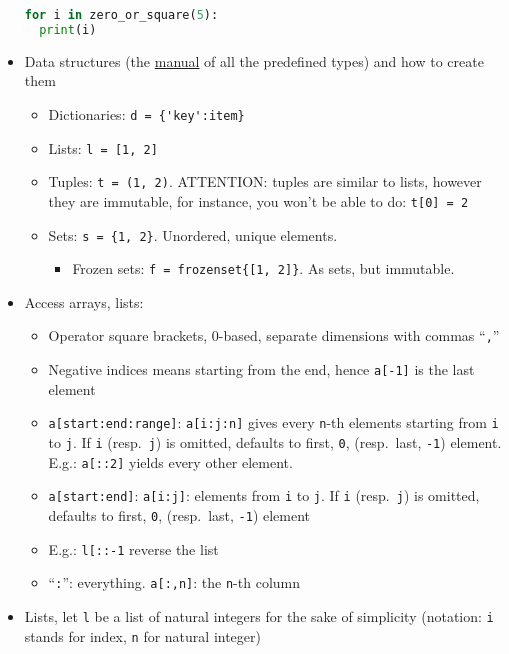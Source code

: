 \documentclass[a4paper,12pt,%
              final%
              ]{article}
\begin{document}
\begin{itemize}
\begin{lstlisting}[language=python]
for i in zero_or_square(5):
  print(i)
\end{lstlisting}
  \item Data structures (the \href{https://docs.python.org/3/library/stdtypes.html}{manual} of all the predefined types) and how to create them
    \begin{itemize}
      \item Dictionaries: \verb|d = {'key':item}|
      \item Lists: \verb|l = [1, 2]|
      \item Tuples: \verb|t = (1, 2)|. ATTENTION: tuples are similar to lists, however they are immutable, for instance, you won't be able to do: \verb|t[0] = 2|
      \item Sets: \verb|s = {1, 2}|. Unordered, unique elements.
        \begin{itemize}
          \item Frozen sets: \verb|f = frozenset{[1, 2]}|. As sets, but immutable.
        \end{itemize}
    \end{itemize}
  \item Access arrays, lists:
    \begin{itemize}
      \item Operator square brackets, 0-based, separate dimensions with commas ``\texttt{,}''
      \item Negative indices means starting from the end, hence \texttt{a[-1]} is the last element
      \item \verb|a[start:end:range]|: \verb|a[i:j:n]| gives every \texttt{n}-th elements starting from \texttt{i} to \texttt{j}. If \texttt{i} (resp.~\texttt{j}) is omitted, defaults to first, \texttt{0}, (resp.~last, \texttt{-1}) element. E.g.: \verb|a[::2]| yields every other element.
      \item \verb|a[start:end]|: \verb|a[i:j]|: elements from \texttt{i} to \texttt{j}. If \texttt{i} (resp.~\texttt{j}) is omitted, defaults to first, \texttt{0}, (resp.~last, \texttt{-1}) element
      \item E.g.: \verb|l[::-1| reverse the list
      \item ``\verb|:|'': everything. \verb|a[:,n]|: the \texttt{n}-th column
    \end{itemize}
  \item Lists, let \verb|l| be a list of natural integers for the sake of simplicity (notation: \verb|i| stands for index, \verb|n| for natural integer)
    \begin{itemize}

\end{itemize}
\end{itemize}
\end{document}
